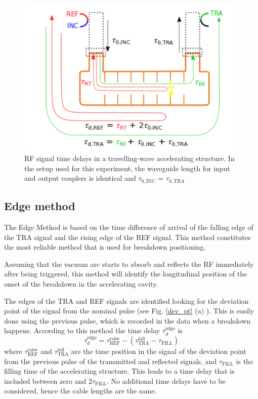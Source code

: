 \begin{figure}[h]
\centering 
\includegraphics[scale=0.3]{pictures/structure_scheme}
\caption{RF signal time delays in a travelling-wave accelerating structure. In the setup used for this experiment, the waveguide length for input and output couplers is identical and $\tau_{0,\text{INC}}$ = $\tau_{0,\text{TRA}}$}
\label{BD_scheme}
\end{figure}


\subsection[Edge method]{Edge method}

The Edge Method is based on the time difference of arrival of the falling edge of the TRA signal and the rising edge of the REF signal. This method constitutes the most reliable method that is used for breakdown positioning. 

Assuming that the vacuum arc starts to absorb and reflects the RF immediately after being triggered, this method will identify the longitudinal position of the onset of the breakdown in the accelerating cavity.

The edges of the TRA and REF signals are identified looking for the deviation point of the signal from the nominal pulse (see Fig. \ref{dev_pt} (a) ). This is easily done using the previous pulse, which is recorded in the data when a breakdown happens.  According to this method the time delay $\tau_d^{\text{edge}}$ is
\begin{equation}
\tau_d^{\text{edge}} = \tau_\text{REF} ^\text{raise} - (\tau_\text{TRA} ^\text{fall} - \tau_{\text{FILL}})
\end{equation}
where $\tau^\text{raise} _{\text{REF}} $ and $\tau^\text{fall} _{\text{TRA}}$ are the time position in the signal of the deviation point from the previous pulse of the transmitted and reflected signals, and $\tau_{\text{FILL}}$ is the filling time of the accelerating structure. This leads to a time delay that is included between zero and $2 \tau_{\text{FILL}}$. No additional time delays have to be considered, hence the cable lengths are the same. 

